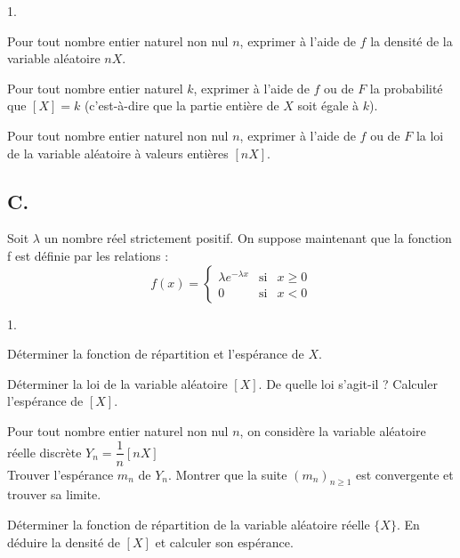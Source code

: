\documentclass[11pt]{article}%
\begin{document}
\begin{noliste}{1.}
 \setlength{\itemsep}{4mm}
\item Pour tout nombre entier naturel non nul $n$, exprimer à l'aide de
$f$
la densité de la variable aléatoire $nX$.

\item Pour tout nombre entier naturel $k$, exprimer à l'aide de $f$ ou
de $F$
la probabilité que $[X] = k$ (c'est-à-dire que la partie entière de $X$
soit égale à $k$).

\item Pour tout nombre entier naturel non nul $n$, exprimer à l'aide de
$f$
ou de $F$ la loi de la variable aléatoire à valeurs entières $[nX]$.
\end{noliste}

\subsection*{C. }

Soit $\lambda $ un nombre réel strictement positif. On suppose
maintenant
que la fonction f est définie par les relations :
\[
f(x) = \left\{ 
\begin{array}{lll}
\lambda e^{-\lambda x} & \text{si} & x\geq 0 \\
0 & \text{si} & x<0
\end{array}
\right. 
\]

\begin{noliste}{1.}
 \setlength{\itemsep}{4mm}
\item Déterminer la fonction de répartition et l'espérance de $X$.

\item Déterminer la loi de la variable aléatoire $[X]$. De quelle loi
s'agit-il ? Calculer l'espérance de $[X]$.

\item Pour tout nombre entier naturel non nul $n$, on considère la
variable
aléatoire réelle discrète $Y_{n} = \dfrac{1}{n}[nX]$\\
Trouver l'espérance $m_{n}$ de $Y_{n}$. Montrer que la suite
$(m_{n})_{n\geq 1}$ est convergente et trouver sa limite.

\item Déterminer la fonction de répartition de la variable aléatoire
réelle $\{X\}$. En déduire la densité de $[X]$ et calculer son
espérance.
\end{noliste}

\label{fin}
\end{document}
